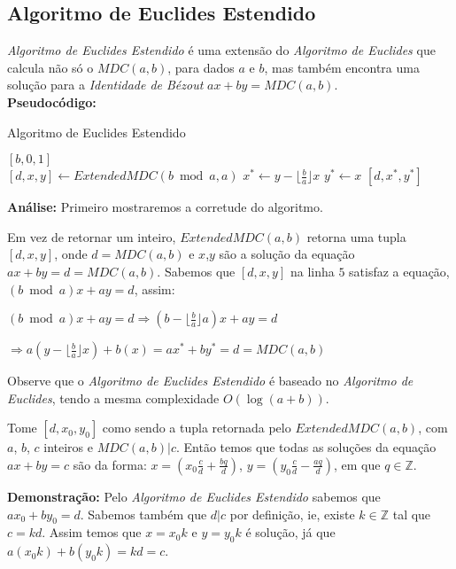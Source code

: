 \subsection{Algoritmo de Euclides Estendido}

\textit{Algoritmo de Euclides Estendido} é uma extensão do \textit{Algoritmo de Euclides} que calcula não só o $MDC(a,b)$, para dados $a$ e $b$, mas também encontra
uma solução para a \textit{Identidade de Bézout} $ax+by = MDC(a,b)$. 
\\

\textbf{Pseudocódigo:}
\begin{algorithm}
\caption{Algoritmo de Euclides Estendido}\label{mdc_extended}
\begin{algorithmic}[1]
\State \Return $[b,0,1]$
\EndIf
\\
\State $[d,x,y] \gets ExtendedMDC(b \bmod a, a)$
\State $x^* \gets y - \lfloor \frac{b}{a} \rfloor x$
\State $y^* \gets x$
\State \Return $[d,x^*,y^*]$
\EndProcedure
\end{algorithmic}
\end{algorithm}

\textbf{Análise:}
Primeiro mostraremos a corretude do algoritmo.

Em vez de retornar um inteiro, $ExtendedMDC(a,b)$ retorna uma tupla $[d,x,y]$, onde $d=MDC(a,b)$ e $x$,$y$ são a solução da equação $ax+by=d=MDC(a,b)$.
Sabemos que $[d,x,y]$ na linha $5$ satisfaz a equação, $(b\bmod a)x + ay = d$, assim:

$(b\bmod a)x + ay = d \Rightarrow (b - \lfloor \frac{b}{a} \rfloor a)x + ay = d$

$\Rightarrow a(y-\lfloor \frac{b}{a} \rfloor x) + b(x) = ax^* + by^* = d = MDC(a,b)$

Observe que o \textit{Algoritmo de Euclides Estendido} é baseado no \textit{Algoritmo de Euclides}, tendo a mesma complexidade $O(\log(a+b))$.
\\


\begin{corollary}\label{mdc_extended_solutions}
Tome $[d,x_0,y_0]$ como sendo a tupla retornada pelo $ExtendedMDC(a,b)$, com $a$, $b$, $c$ inteiros e $MDC(a,b)|c$.
Então temos que todas as soluções da equação $ax+by=c$ são da forma: $x=(x_0\frac{c}{d} + \frac{bq}{d})$, $y=(y_0\frac{c}{d} - \frac{aq}{d})$, em que $q\in\mathbb{Z}$.
\end{corollary}
\textbf{Demonstração:}
Pelo \textit{Algoritmo de Euclides Estendido} sabemos que $ax_0 + by_0=d$. Sabemos também que $d|c$ por definição, ie, existe $k\in\mathbb{Z}$ tal que $c=kd$.
Assim temos que $x=x_0k$ e $y=y_0k$ é solução, já que $a(x_0k)+b(y_0k) = kd = c$. 

